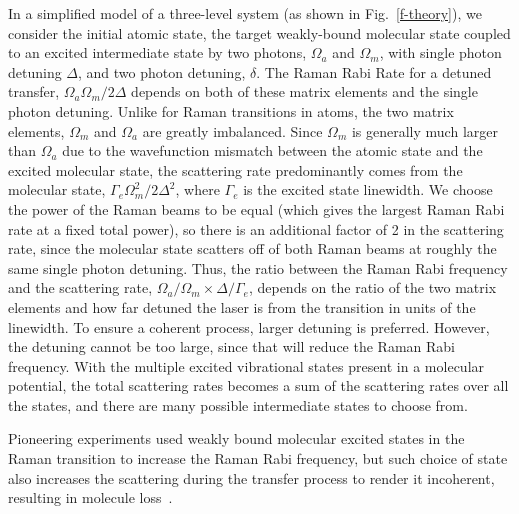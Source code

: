 \documentclass[aps,prl,twocolumn,groupedaddress]{revtex4-1}
\begin{document}
In a simplified model of a three-level system (as shown in Fig.~\ref{f-theory}), we consider the initial atomic state, the target weakly-bound molecular state coupled to an excited intermediate state by two photons, $\Omega_a$ and $\Omega_m$, with single photon detuning $ \Delta $, and two photon detuning, $ \delta$.  %
The Raman Rabi Rate for a detuned transfer, $ \Omega_a\Omega_m / 2\Delta$ depends on both of these matrix elements and the single photon detuning. Unlike for Raman transitions in atoms, the two matrix elements, $ \Omega_m$ and $ \Omega_a$ are greatly imbalanced. Since $ \Omega_m $ is generally much larger than $ \Omega_a $ due to the wavefunction mismatch between the atomic state and the excited molecular state, the scattering rate predominantly comes from the molecular state, $ \Gamma_e \Omega_m^2 / 2\Delta^2$, where $ \Gamma_e $ is the excited state linewidth. We choose the power of the Raman beams to be equal (which gives the largest Raman Rabi rate at a fixed total power), so there is an additional factor of 2 in the scattering rate, since the molecular state scatters off of both Raman beams at roughly the same single photon detuning. Thus, the ratio between the Raman Rabi frequency and the scattering rate, $ \Omega_a/\Omega_m \times \Delta/\Gamma_e $, depends on the ratio of the two matrix elements and how far detuned the laser is from the transition in units of the linewidth. To ensure a coherent process, larger detuning is preferred. However, the detuning cannot be too large, since that will reduce the Raman Rabi frequency. With the multiple excited vibrational states present in a molecular potential, the total scattering rates becomes a sum of the scattering rates over all the states, and there are many possible intermediate states to choose from. 

Pioneering experiments used weakly bound molecular excited states in the Raman transition to increase the Raman Rabi frequency, but such choice of state also increases the scattering during the transfer process to render it incoherent, resulting in molecule loss~\cite{Wynar2000,Rom2004}.
\end{document}
